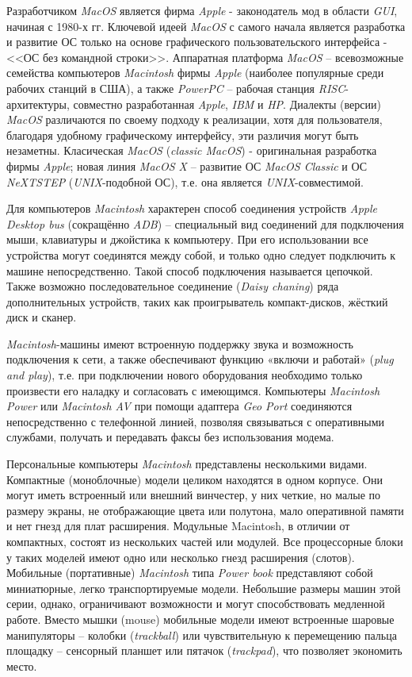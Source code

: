Разработчиком \textit{MacOS} является фирма \textit{Apple} - законодатель мод в области \textit{GUI}, начиная с 1980-х гг. Ключевой идеей \textit{MacOS} с самого начала является разработка и развитие ОС только на основе графического пользовательского интерфейса - <<ОС без командной строки>>. Аппаратная платформа \textit{MacOS} – всевозможные семейства компьютеров \textit{Macintosh} фирмы \textit{Apple} (наиболее популярные среди рабочих станций в США), а также \textit{PowerPC} – рабочая станция \textit{RISC}-архитектуры, совместно разработанная \textit{Apple}, \textit{IBM} и \textit{HP}. Диалекты (версии) \textit{MacOS} различаются по своему подходу к реализации, хотя для пользователя, благодаря удобному графическому интерфейсу, эти различия могут быть незаметны. Класическая \textit{MacOS} (\textit{classic MacOS}) - оригинальная разработка фирмы \textit{Apple}; новая линия \textit{MacOS X} – развитие ОС \textit{MacOS Classic} и ОС \textit{NeXTSTEP} (\textit{UNIX}-подобной ОС), т.е. она является \textit{UNIX}-совместимой.

Для компьютеров \textit{Macintosh} характерен способ соединения устройств \textit{Apple Desktop bus} (сокращённо \textit{ADB}) – специальный вид соединений для подключения мыши, клавиатуры и джойстика к компьютеру. При его использовании все устройства могут соединятся между собой, и только одно следует подключить к машине непосредственно. Такой способ подключения называется цепочкой. Также возможно последовательное соединение (\textit{Daisy chaning}) ряда дополнительных устройств, таких как проигрыватель компакт-дисков, жёсткий диск и сканер.

\textit{Macintosh}-машины имеют встроенную поддержку звука и возможность подключения к сети, а также обеспечивают функцию «включи и работай» (\textit{plug and play}), т.е. при подключении нового оборудования необходимо только произвести его наладку и согласовать с имеющимся. Компьютеры \textit{Macintosh Power} или \textit{Macintosh AV} при помощи адаптера \textit{Geo Port} соединяются непосредственно с телефонной линией, позволяя связываться с оперативными службами, получать и передавать факсы без использования модема.

Персональные компьютеры \textit{Macintosh} представлены несколькими видами. Компактные (моноблочные) модели целиком находятся в одном корпусе. Они могут иметь встроенный или внешний винчестер, у них четкие, но малые по размеру экраны, не отображающие цвета или полутона, мало оперативной памяти и нет гнезд для плат расширения. Модульные Macintosh, в отличии от компактных, состоят из нескольких частей или модулей. Все процессорные блоки у таких моделей имеют одно или несколько гнезд расширения (слотов). Мобильные (портативные) \textit{Macintosh} типа \textit{Power book} представляют собой миниатюрные, легко транспортируемые модели. Небольшие размеры машин этой серии, однако, ограничивают возможности и могут способствовать медленной работе. Вместо мышки (mouse) мобильные модели имеют встроенные шаровые манипуляторы – колобки (\textit{trackball}) или чувствительную к перемещению пальца площадку – сенсорный планшет или пятачок (\textit{trackpad}), что позволяет экономить место.

